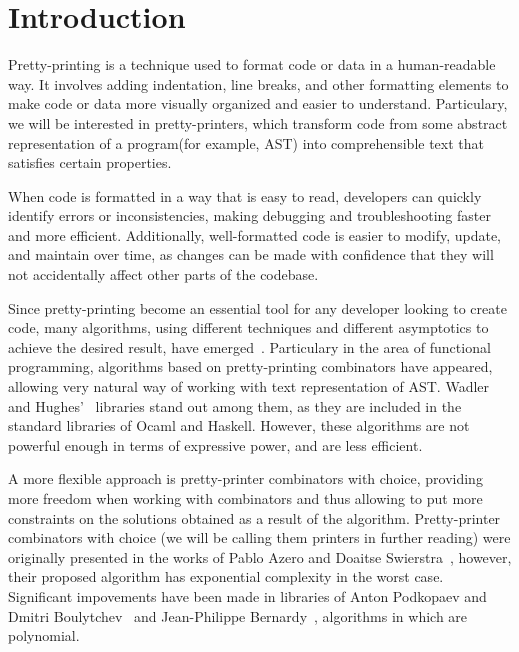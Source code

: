 \documentclass[14pt]{constructor-diploma}
\begin{document}
\maketitle
\tableofcontents
\section*{Introduction}
Pretty-printing is a technique used to format code or data in a human-readable way.
It involves adding indentation, line breaks, and other formatting elements to make code or data more visually organized and easier to understand.
Particulary, we will be interested in pretty-printers, 
which transform code from some abstract representation of a program(for example, AST)
into comprehensible text that satisfies certain properties.

When code is formatted in a way that is easy to read,
developers can quickly identify errors or inconsistencies, 
making debugging and troubleshooting faster and more efficient.
Additionally, well-formatted code is easier to modify, update, and maintain over time, 
as changes can be made with confidence that they will not accidentally affect other parts of the codebase.

Since pretty-printing become an essential tool for any developer looking to create code, many algorithms, using different techniques and different asymptotics to achieve the desired result,
have emerged~\cite{oppen,azero,hughes,swierstra,podkopaev,bernardy}. Particulary in the area of functional programming, algorithms based on pretty-printing combinators have appeared,
allowing very natural way of working with text representation of AST. 
Wadler~\cite{wadler} and Hughes'~\cite{hughes} libraries stand out among them, as they are included in the standard libraries of Ocaml and Haskell.
However, these algorithms are not powerful enough in terms of expressive power, and are less efficient.

A more flexible approach is pretty-printer combinators with choice,
providing more freedom when working with combinators and thus allowing to put more constraints on the solutions obtained
as a result of the algorithm.
Pretty-printer combinators with choice (we will be calling them printers in further reading) were originally presented in the works of Pablo Azero and Doaitse Swierstra~\cite{azero, swierstra}, 
however, their proposed algorithm has exponential complexity in the worst case. Significant impovements have been made in 
libraries of Anton Podkopaev and Dmitri Boulytchev~\cite{podkopaev} and Jean-Philippe Bernardy~\cite{bernardy}, algorithms in which are polynomial.
\end{document}
